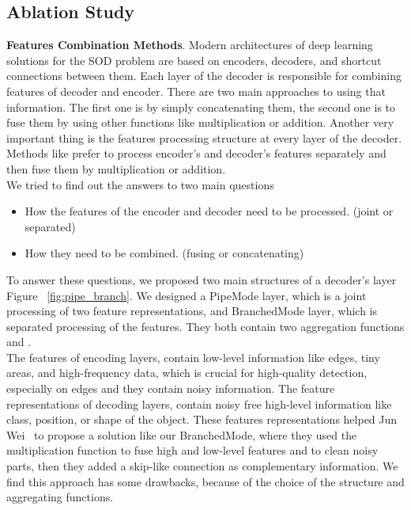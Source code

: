 \documentclass[10pt,twocolumn,letterpaper]{article}
\begin{document}
\subsection{Ablation Study}
\label{abl}
\textbf{Features Combination Methods}. Modern architectures of deep learning solutions for the SOD problem are based on encoders, decoders, and shortcut connections between them. Each layer of the decoder is responsible for combining features of decoder and encoder. There are two main approaches to using that information. The first one is by simply concatenating them, the second one is to fuse them by using other functions like multiplication or addition. Another very important thing is  the features processing structure at every layer of the decoder. Methods like \cite{GCPANet, F3Net} prefer to process encoder's and decoder's features separately and then fuse them by multiplication or addition. \\
We tried to find out the answers to two main questions
\begin{itemize}
  \item How the features of the encoder and decoder need to be processed. (joint or separated)
  \item How they need to be combined. (fusing or concatenating)
\end{itemize}

To answer these questions, we proposed two main structures of a decoder's layer Figure ~\ref{fig:pipe_branch}. We designed a PipeMode layer, which is a joint processing of two feature representations, and BranchedMode layer, which is separated processing of the features. They both contain two aggregation functions  and .
\\The features of encoding layers,  contain low-level information like edges, tiny areas, and high-frequency data, which is crucial for high-quality detection, especially on edges and they contain noisy information. The feature representations of decoding layers,  contain noisy free high-level information like class, position, or shape of the object. These features representations helped Jun Wei~\etal \cite{F3Net} to propose a solution like our BranchedMode, where they used the multiplication function to fuse high and low-level features and to clean noisy parts, then they added a skip-like connection as complementary information. We find this approach has some drawbacks, because of the choice of the structure and aggregating functions.
\end{document}
